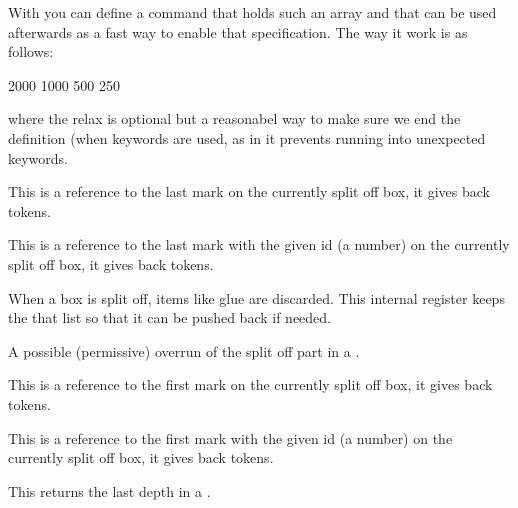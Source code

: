 With  you can define a command that holds such an array
and that can be used afterwards as a fast way to enable that specification. The
way it work is as follows:

\starttyping
\specificationdef\MyWidowPenalties
     2000 1000 500 250
\relax
\stoptyping

where the relax is optional but a reasonabel way to make sure we end the
definition (when keywords are used, as in  it prevents running
into unexpected keywords.

\stopnewprimitive

\startoldprimitive[title={\prm {splitbotmark}}][obsolete=yes]

This is a reference to the last mark on the currently split off box, it gives
back tokens.

\stopoldprimitive

\startoldprimitive[title={\prm {splitbotmarks}}]

This is a reference to the last mark with the given id (a number) on the
currently split off box, it gives back tokens.

\stopoldprimitive

\startoldprimitive[title={\prm {splitdiscards}}]

When a box is split off, items like glue are discarded. This internal register
keeps the that list so that it can be pushed back if needed.

\stopoldprimitive

\startnewprimitive[title={\prm {splitextraheight}}]

A possible (permissive) overrun of the split off part in a .

\stopnewprimitive

\startoldprimitive[title={\prm {splitfirstmark}}][obsolete=yes]

This is a reference to the first mark on the currently split off box, it gives
back tokens.

\stopoldprimitive

\startoldprimitive[title={\prm {splitfirstmarks}}]

This is a reference to the first mark with the given id (a number) on the
currently split off box, it gives back tokens.

\stopoldprimitive

\startnewprimitive[title={\prm {splitlastdepth}}]

This returns the last depth in a .

